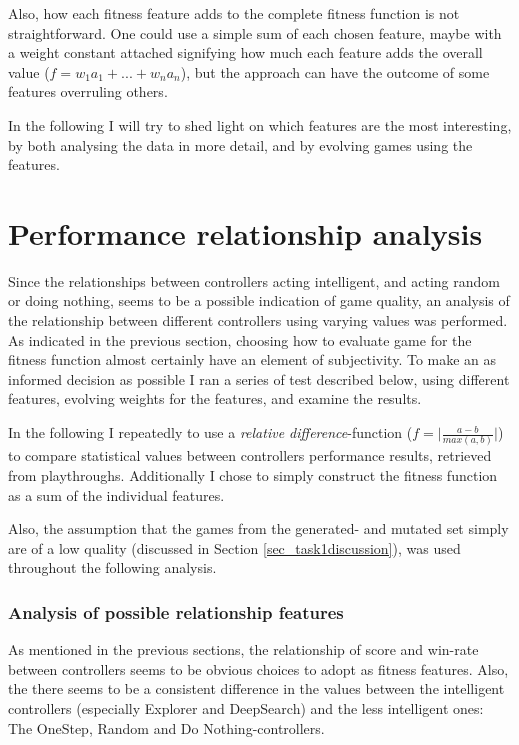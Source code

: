 \documentclass[a4paper,titlepage,final]{report}
\begin{document}
Also, how each fitness feature adds to the complete fitness function is not straightforward.
One could use a simple sum of each chosen feature, maybe with a weight constant attached signifying how much each feature adds the overall value ($f = w_1a_1+...+w_na_n$), but the approach can have the outcome of some features overruling others.

In the following I will try to shed light on which features are the most interesting, by both analysing the data in more detail, and by evolving games using the features.



\section{Performance relationship analysis}
\label{sec_task2fitnessSelection}
Since the relationships between controllers acting intelligent, and acting random or doing nothing, seems to be a possible indication of game quality, an analysis of the relationship between different controllers using varying values was performed.
As indicated in the previous section, choosing how to evaluate game for the fitness function almost certainly have an element of  subjectivity. 
To make an as informed decision as possible I ran a series of test described below, using different features, evolving weights for the features, and examine the results.

In the following I repeatedly to use a \textit{relative difference}-function ($f=\lvert\frac{a-b}{max(a,b)}\rvert$) to compare statistical values  between controllers performance results, retrieved from playthroughs.
Additionally I chose to simply construct the fitness function as a sum of the individual features.

Also, the assumption that the games from the generated- and mutated set simply are of a low quality (discussed in Section \ref{sec_task1discussion}), was used throughout the following analysis.

\subsubsection*{Analysis of possible relationship features}
As mentioned in the previous sections, the relationship of score and win-rate between controllers seems to be obvious choices to adopt as fitness features.
Also, the there seems to be a consistent difference in the values between the intelligent controllers (especially Explorer and DeepSearch) and the less intelligent ones: The OneStep, Random and Do Nothing-controllers.
\end{document}
